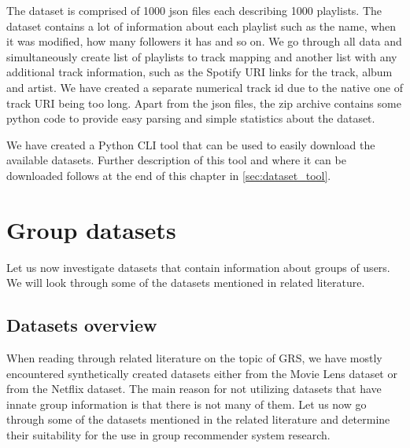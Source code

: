\begin{itemize}
    The dataset is comprised of 1000 json files each describing 1000 playlists. The dataset contains a lot of information about each playlist such as the name, when it was modified, how many followers it has and so on. We go through all data and simultaneously create list of playlists to track mapping and another list with any additional track information, such as the Spotify URI links for the track, album and artist. We have created a separate numerical track id due to the native one of track URI being too long. Apart from the json files, the zip archive contains some python code to provide easy parsing and simple statistics about the dataset.
    
\end{itemize}





We have created a Python CLI tool that can be used to easily download the available datasets. Further description of this tool and where it can be downloaded follows at the end of this chapter in \ref{sec:dataset_tool}.


\section{Group datasets}
Let us now investigate datasets that contain information about groups of users. We will look through some of the datasets mentioned in related literature.

\subsection{Datasets overview}\label{subsection:04_}

When reading through related literature on the topic of GRS, we have mostly encountered synthetically created datasets either from the Movie Lens dataset or from the Netflix dataset. The main reason for not utilizing datasets that have innate group information is that there is not many of them. Let us now go through some of the datasets mentioned in the related literature and determine their suitability for the use in group recommender system research.

